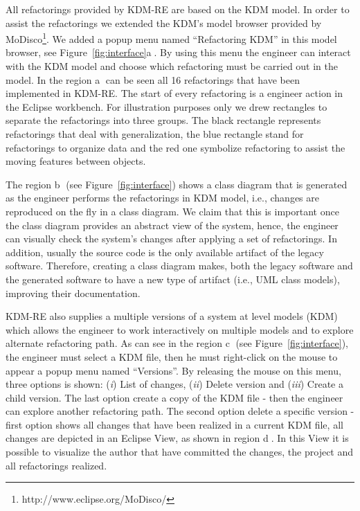All refactorings provided by KDM-RE are based on the KDM model. 
In order to assist the refactorings we extended the KDM's model browser provided by MoDisco\footnote{http://www.eclipse.org/MoDisco/}. 
We added a popup menu named ``Refactoring KDM'' in this model browser, see Figure~\ref{fig:interface}\textcircled{a}.
By using this menu the engineer can interact with the KDM model and choose which refactoring must be carried out in the model.
In the region \textcircled{a} can be seen all 16 refactorings that have been implemented in KDM-RE. 
The start of every refactoring is a engineer action in the Eclipse workbench.
For illustration purposes only we drew rectangles to separate the refactorings into three groups. 
The black rectangle represents refactorings that deal with generalization, the blue rectangle stand for refactorings to organize data and the red one symbolize refactoring to assist the moving features between objects.

The region \textcircled{b} (see Figure~\ref{fig:interface}) shows a class diagram that is generated as the engineer performs the refactorings in KDM model, i.e., changes are reproduced on the fly in a class diagram.
We claim that this is important once the class diagram provides an abstract view of the system, hence, the engineer can visually check the system's changes after applying a set of refactorings. 
In addition, usually the source code is the only available artifact of the legacy software. 
Therefore, creating a class diagram makes, both the legacy software and the generated software to have a new type of artifact (i.e., UML class models), improving their documentation.

KDM-RE also supplies a multiple versions of a system at level models (KDM) which allows the engineer to work interactively on multiple models and to explore alternate refactoring path. As can see in the region \textcircled{c} (see Figure~\ref{fig:interface}), the engineer must select a KDM file, then he must right-click on the mouse to appear a popup menu named ``Versions''. By releasing the mouse on this menu, three options is shown: (\textit{i}) List of changes, (\textit{ii}) Delete version and (\textit{iii}) Create a child version. The last option create a copy of the KDM file - then the engineer can explore another refactoring path. The second option delete a specific version - first option shows all changes that have been realized in a current KDM file, all changes are depicted in an Eclipse View, as shown in region \textcircled{d}. In this View it is possible to visualize the author that have committed the changes, the project and all refactorings realized.


